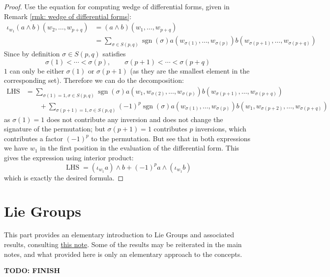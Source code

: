 \documentclass{article}
\begin{document}
\begin{proof}
    Use the equation for computing wedge of differential forms, given in Remark \ref{rmk: wedge of differential forms}:
    \begin{align*}
        \iota_{w_1}(a \wedge b)(w_2, \dots, w_{p+q})
        & = (a \wedge b) (w_1, \dots, w_{p+q}) \\
        & = \sum_{\sigma \in S(p, q)} \operatorname{sgn}(\sigma) a(w_{\sigma(1)}, \dots, w_{\sigma(p)}) b(w_{\sigma(p+1)}, \dots, w_{\sigma(p+q)}) 
    \end{align*}
    Since by definition $\sigma \in S(p, q)$ satisfies
    \[
        \sigma(1) < \cdots < \sigma(p), \qquad \sigma(p+1) < \cdots < \sigma(p+q)
    \]
    $1$ can only be either $\sigma(1)$ or $\sigma(p+1)$ (as they are the smallest element in the corresponding set). Therefore we can do the decomposition:
    \begin{align*}
        \operatorname{LHS} 
        & = \sum_{\sigma(1) = 1, \sigma \in S(p, q)} \operatorname{sgn}(\sigma) a(w_{1}, w_{\sigma(2)}, \dots, w_{\sigma(p)}) b(w_{\sigma(p+1)}, \dots, w_{\sigma(p+q)}) \\
        & \qquad + \sum_{\sigma(p+1) = 1, \sigma \in S(p, q)} (-1)^p\operatorname{sgn}(\sigma) a(w_{\sigma(1)}, \dots, w_{\sigma(p)}) b(w_1, w_{\sigma(p+2)}, \dots, w_{\sigma(p+q)}) 
    \end{align*}
    as $\sigma(1) = 1$ does not contribute any inversion and does not change the signature of the permutation; but $\sigma(p+1) = 1$ contributes $p$ inversions, which contributes a factor $(-1)^p$ to the permutation. But see that in both expressions we have $w_1$ in the first position in the evaluation of the differential form. This gives the expression using interior product:
    \[
        \operatorname{LHS} = (\iota_{w_1} a) \wedge b + (-1)^p a \wedge (\iota_{w_1} b)
    \]
    which is exactly the desired formula. 
\end{proof}

\section{Lie Groups}

\textstart
This part provides an elementary introduction to Lie Groups and associated results, consulting \href{https://scholar.rose-hulman.edu/rhumj/vol15/iss2/5}{this note}. Some of the results may be reiterated in the main notes, and what provided here is only an elementary approach to the concepts. 

\textbf{TODO: FINISH}
\end{document}
